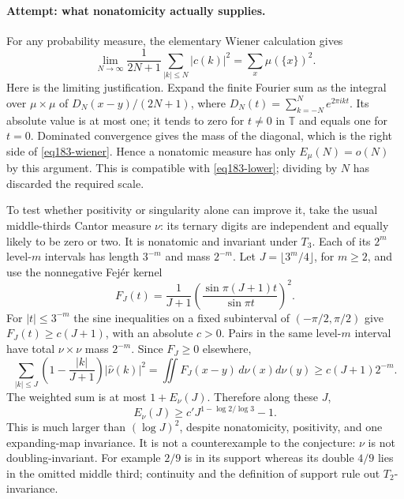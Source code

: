 \documentclass[11pt,a4paper]{article}
\numberwithin{equation}{section}
\begin{document}
\paragraph{Attempt: what nonatomicity actually supplies.}
For any probability measure, the elementary Wiener calculation gives
\begin{equation}\label{eq183-wiener}
 \lim_{N\to\infty}\frac{1}{2N+1}
             \sum_{|k|\le N}|c(k)|^2
                        =\sum_x\mu(\{x\})^2.
\end{equation}
Here is the limiting justification. Expand the finite Fourier sum as the
integral over $\mu\times\mu$ of
$D_N(x-y)/(2N+1)$, where
$D_N(t)=\sum_{k=-N}^{N}e^{2\pi ikt}$. Its absolute value is at most one;
it tends to zero for $t\ne0$ in $\mathbb T$ and equals one for $t=0$.
Dominated convergence gives the mass of the diagonal, which is the right
side of \eqref{eq183-wiener}. Hence a nonatomic measure has only
$E_\mu(N)=o(N)$ by this argument. This is compatible with
\eqref{eq183-lower}; dividing by $N$ has discarded the required scale.

To test whether positivity or singularity alone can improve it, take the
usual middle-thirds Cantor measure $\nu$: its ternary digits are independent
and equally likely to be zero or two. It is nonatomic and invariant under
$T_3$. Each of its $2^m$ level-$m$ intervals has length $3^{-m}$ and mass
$2^{-m}$. Let $J=\lfloor3^m/4\rfloor$, for $m\ge2$, and use the
nonnegative Fej\'er kernel
\[
 F_J(t)=\frac1{J+1}\left(\frac{\sin\pi(J+1)t}{\sin\pi t}\right)^2.
\]
For $|t|\le3^{-m}$ the sine inequalities on a fixed subinterval of
$(-\pi/2,\pi/2)$ give $F_J(t)\ge c(J+1)$, with an absolute $c>0$.
Pairs in the same level-$m$ interval have total $\nu\times\nu$ mass
$2^{-m}$. Since $F_J\ge0$ elsewhere,
\[
 \sum_{|k|\le J}\left(1-\frac{|k|}{J+1}\right)|\widehat\nu(k)|^2
   =\iint F_J(x-y)\,d\nu(x)d\nu(y)
   \ge c(J+1)2^{-m}.
\]
The weighted sum is at most $1+E_\nu(J)$. Therefore along these $J$,
\begin{equation}\label{eq183-cantor}
       E_\nu(J)\ge c'J^{1-\log2/\log3}-1.
\end{equation}
This is much larger than $(\log J)^2$, despite nonatomicity, positivity,
and one expanding-map invariance. It is not a counterexample to the
conjecture: $\nu$ is not doubling-invariant. For example $2/9$ is in its
support whereas its double $4/9$ lies in the omitted middle third;
continuity and the definition of support rule out $T_2$-invariance.
\end{document}
